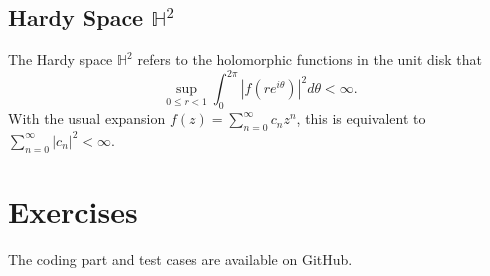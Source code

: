 \subsection{Hardy Space \texorpdfstring{${\mathbb{H}}^2$}{}}
\label{SSec: 2-Har-Spa}
The Hardy space $\mathbb{H}^2$ refers to the holomorphic functions in the unit disk that 
\begin{equation}
    \sup_{0\le r <  1} \int_0^{2\pi} |f(r e^{i\theta})|^2 d\theta < \infty.
\end{equation}
With the usual expansion $f(z) = \sum_{n=0}^{\infty} c_n z^n$, this is equivalent to $\sum_{n=0}^{\infty} |c_n|^2 < \infty$. 
\section{Exercises}
The coding part and test cases are available on GitHub. 
